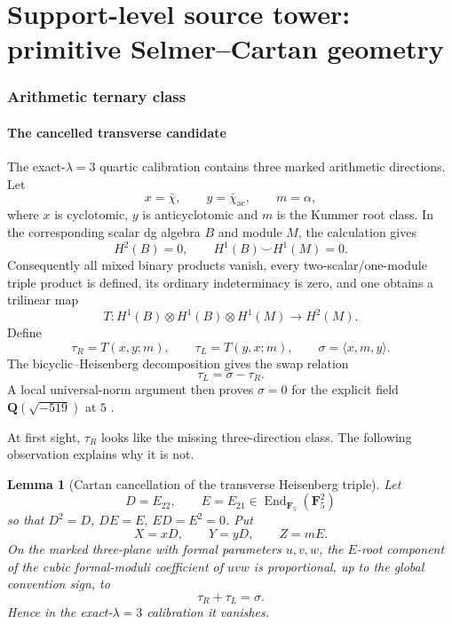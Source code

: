 \documentclass[11pt]{article}
\newtheorem{lemma}[theorem]{Lemma}
\theoremstyle{remark}
\newcommand{\F}{\mathbf F}
\providecommand{\Q}{\mathbf Q}
\providecommand{\End}{\operatorname{End}}
\begin{document}
\part{Support-level source tower: primitive Selmer--Cartan geometry}
\section{Arithmetic ternary class}

\subsection{The cancelled transverse candidate}

The exact-\(\lambda=3\) quartic calibration contains three marked arithmetic directions.  Let
\[
 x=\bar\chi,\qquad
 y=\bar\chi_{\mathrm{ac}},\qquad
 m=\alpha,
\]
where \(x\) is cyclotomic, \(y\) is anticyclotomic and \(m\) is the Kummer root class.  In the corresponding scalar dg algebra \(B\) and module \(M\), the calculation gives
\[
 H^2(B)=0,
 \qquad
 H^1(B)\smile H^1(M)=0.
\]
Consequently all mixed binary products vanish, every two-scalar/one-module triple product is defined, its ordinary indeterminacy is zero, and one obtains a trilinear map
\[
 T:H^1(B)\otimes H^1(B)\otimes H^1(M)\longrightarrow H^2(M).
\]
Define
\[
 \tau_R=T(x,y;m),\qquad
 \tau_L=T(y,x;m),\qquad
 \sigma=\langle x,m,y\rangle.
\]
The bicyclic--Heisenberg decomposition gives the swap relation
\begin{equation}\label{P1L-eq:swap}
 \tau_L=\sigma-\tau_R.
\end{equation}
A local universal-norm argument then proves \(\sigma=0\) for the explicit field \(\Q(\sqrt{-519})\) at \(5\) .

At first sight, \(\tau_R\) looks like the missing three-direction class.  The following observation explains why it is not.

\begin{lemma}[Cartan cancellation of the transverse Heisenberg triple]\label{P1L-prop:cartan-cancellation}
Let
\[
 D=E_{22},\qquad E=E_{21}\in \End_{\F_5}(\F_5^2)
\]
so that \(D^2=D\), \(DE=E\), \(ED=E^2=0\).  Put
\[
 X=xD,\qquad Y=yD,\qquad Z=mE.
\]
On the marked three-plane with formal parameters \(u,v,w\), the \(E\)-root component of the cubic formal-moduli coefficient of \(uvw\) is proportional, up to the global convention sign, to
\[
 \tau_R+\tau_L=\sigma.
\]
Hence in the exact-\(\lambda=3\) calibration it vanishes.
\end{lemma}
\end{document}
